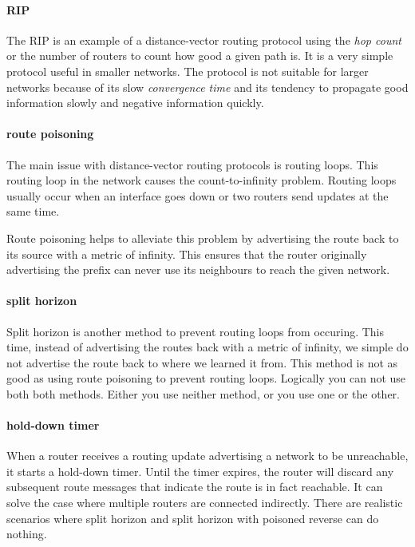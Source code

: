 \paragraph{\acf{RIP}}
The \acl{RIP} is an example of a distance-vector routing protocol using the \emph{hop count} or the number of routers to count how good a given path is.%
It is a very simple protocol useful in smaller networks.
The protocol is not suitable for larger networks because of its slow \emph{convergence time} and its tendency to propagate good information slowly and negative information quickly.

\paragraph{route poisoning}
The main issue with distance-vector routing protocols is routing loops.%
This routing loop in the network causes the count-to-infinity problem.%
Routing loops usually occur when an interface goes down or two routers send updates at the same time.

Route poisoning helps to alleviate this problem by advertising the route back to its source with a metric of infinity.
This ensures that the router originally advertising the prefix can never use its neighbours to reach the given network.

\paragraph{split horizon}
Split horizon is another method to prevent routing loops from occuring.%
This time, instead of advertising the routes back with a metric of infinity, we simple do not advertise the route back to where we learned it from.
This method is not as good as using route poisoning to prevent routing loops.
Logically you can not use both both methods. Either you use neither method, or you use one or the other.

\paragraph{hold-down timer}
When a router receives a routing update advertising a network to be unreachable, it starts a hold-down timer.
Until the timer expires, the router will discard any subsequent route messages that indicate the route is in fact reachable.
It can solve the case where multiple routers are connected indirectly.
There are realistic scenarios where split horizon and split horizon with poisoned reverse can do nothing.%


